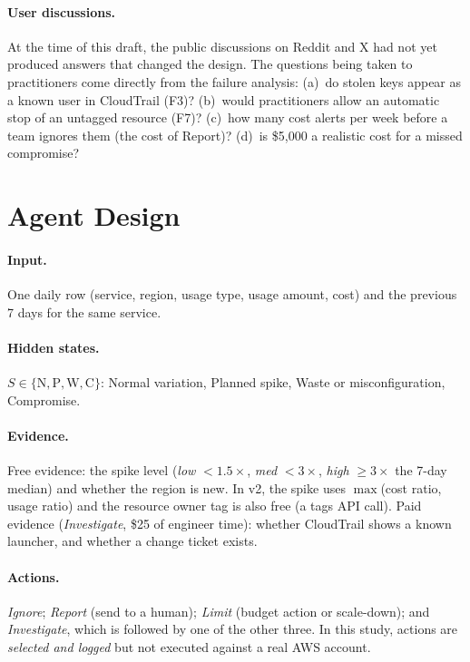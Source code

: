 \documentclass{article}
\begin{document}
\paragraph{User discussions.} At the time of this draft, the public discussions on Reddit and X had not yet produced answers that changed the design. The questions being taken to practitioners come directly from the failure analysis: (a)~do stolen keys appear as a known user in CloudTrail (F3)? (b)~would practitioners allow an automatic stop of an untagged resource (F7)? (c)~how many cost alerts per week before a team ignores them (the cost of Report)? (d)~is \$5{,}000 a realistic cost for a missed compromise?

\section{Agent Design}

\paragraph{Input.} One daily row (service, region, usage type, usage amount, cost) and the previous 7 days for the same service.

\paragraph{Hidden states.} $S \in \{\mathrm{N}, \mathrm{P}, \mathrm{W}, \mathrm{C}\}$: Normal variation, Planned spike, Waste or misconfiguration, Compromise.

\paragraph{Evidence.} Free evidence: the spike level (\emph{low} $<1.5\times$, \emph{med} $<3\times$, \emph{high} $\geq 3\times$ the 7-day median) and whether the region is new. In v2, the spike uses $\max$(cost ratio, usage ratio) and the resource owner tag is also free (a tags API call). Paid evidence (\emph{Investigate}, \$25 of engineer time): whether CloudTrail shows a known launcher, and whether a change ticket exists.

\paragraph{Actions.} \emph{Ignore}; \emph{Report} (send to a human); \emph{Limit} (budget action or scale-down); and \emph{Investigate}, which is followed by one of the other three. In this study, actions are \emph{selected and logged} but not executed against a real AWS account.
\end{document}
